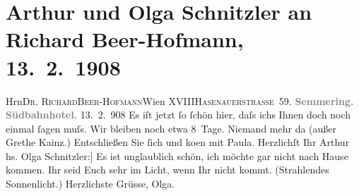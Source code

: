 

         
         \renewcommand{\erwaehntePersonen}{Personen: Richard Beer-Hofmann, Paula Beer-Hofmann, Margarethe Kainz, Olga Schnitzler}
         \renewcommand{\erwaehnteOrte}{Orte: Hasenauerstraße, Semmering, Südbahnhotel, Wien, XVIII., Währing}
         \renewcommand{\erwaehnteWerke}{}
               \section[Arthur und Olga Schnitzler an Richard Beer-Hofmann, 13. 2. 1908]{ Arthur und Olga Schnitzler an Richard Beer-Hofmann, 13. 2. 1908}\nopagebreak{}\rehead{ }\begin{ledgroupsized}[t]{13cm}\normalsize\beginnumbering \toendnotes[C]{\smallbreak\pagebreak[2]} 
\pstart{}{\pb}Hrn\pend{}\pstart{}\textsc{Dr. Richard}\pend{}\pstart{}\textsc{Beer-Hofmann}\pend{}\pstart{}Wien XVIII\pend{}\pstart{}\textsc{Hasenauerstraße 59}.\pend{}{\bigskip}\pstart
           \noindent{}\centering{}\textcolor{gray}{\textbf{{\pb}Semmering.{ }Südbahnhotel.}}\pend
           \pstart
           \raggedleft{}{\pb}13. 2. 908\pend
           \pstart
           Es iſt jetzt ſo ſchön hier, daſs ichs Ihnen doch noch einmal ſagen muſs. Wir bleiben
               noch etwa 8 Tage.\pend
           \pstart
           Niemand mehr da (außer Grethe Kainz.)
               Entschließen Sie ſich und ko{\geminationm}en mit Paula.\pend
           \pstart Herzlichſt Ihr \spacefill\mbox{Arthur}\pend{}\pstart
           \noindent{}{[}hs. Olga Schnitzler:{]} Es ist unglaublich schön, ich möchte gar nicht nach
               Hause kommen. Ihr seid Euch sehr im Licht, wenn Ihr nicht kommt. (Strahlendes
               Sonnenlicht.)\pend
           \pstart  Herzlichste Grüsse, \spacefill\mbox{Olga.}\pend{}
         
         \endnumbering{}\end{ledgroupsized}  \newcommand{\dateiname}{L01760}\newcommand{\titel}{Arthur und Olga Schnitzler an Richard Beer-Hofmann, 13. 2. 1908}\newcommand{\editorInnen}{Martin Anton Müller und Gerd-Hermann Susen}
      